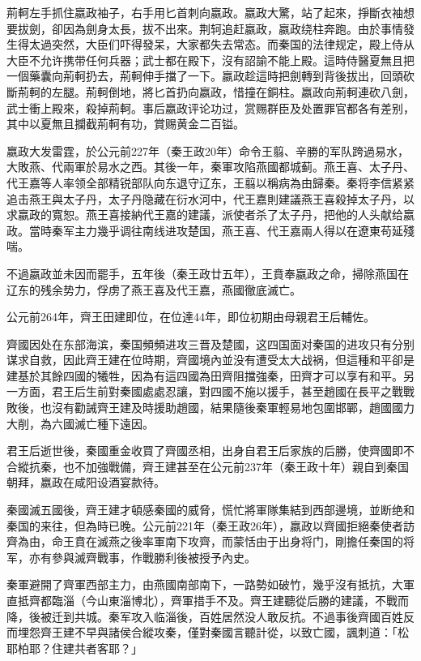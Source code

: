 荊軻左手抓住嬴政袖子，右手用匕首刺向嬴政。嬴政大驚，站了起來，掙斷衣袖想要拔劍，卻因為劍身太長，拔不出來。荆轲追赶嬴政，嬴政绕柱奔跑。由於事情發生得太過突然，大臣们吓得發呆，大家都失去常态。而秦国的法律规定，殿上侍从大臣不允许携带任何兵器；武士都在殿下，沒有詔諭不能上殿。這時侍醫夏無且把一個藥囊向荊軻扔去，荊軻伸手擋了一下。嬴政趁這時把劍轉到背後拔出，回頭砍斷荊軻的左腿。荊軻倒地，將匕首扔向嬴政，惜撞在銅柱。嬴政向荊軻連砍八劍，武士衝上殿來，殺掉荊軻。事后嬴政评论功过，赏赐群臣及处置罪官都各有差别，其中以夏無且攔截荊軻有功，賞赐黄金二百镒。

嬴政大发雷霆，於公元前227年（秦王政20年）命令王翦、辛勝的军队跨過易水，大敗燕、代兩軍於易水之西。其後一年，秦軍攻陷燕國都城蓟。燕王喜、太子丹、代王嘉等人率领全部精锐部队向东退守辽东，王翦以稱病為由歸秦。秦将李信紧紧追击燕王與太子丹，太子丹隐藏在衍水河中，代王嘉則建議燕王喜殺掉太子丹，以求嬴政的寬恕。燕王喜接納代王嘉的建議，派使者杀了太子丹，把他的人头献给嬴政。當時秦军主力幾乎调往南线进攻楚国，燕王喜、代王嘉兩人得以在遼東苟延殘喘。

不過嬴政並未因而罷手，五年後（秦王政廿五年），王賁奉嬴政之命，掃除燕国在辽东的残余势力，俘虏了燕王喜及代王嘉，燕國徹底滅亡。

公元前264年，齊王田建即位，在位達44年，即位初期由母親君王后輔佐。

齊國因处在东部海滨，秦国頻頻进攻三晋及楚國，这四国面对秦国的进攻只有分别谋求自救，因此齊王建在位時期，齊國境內並没有遭受太大战祸，但這種和平卻是建基於其餘四國的犧牲，因為有這四國為田齊阻擋強秦，田齊才可以享有和平。另一方面，君王后生前對秦國處處忍讓，對四國不施以援手，甚至趙國在長平之戰戰敗後，也沒有勸誡齊王建及時援助趙國，結果隨後秦軍輕易地包圍邯鄲，趙國國力大削，為六國滅亡種下遠因。

君王后逝世後，秦國重金收買了齊國丞相，出身自君王后家族的后勝，使齊國即不合縱抗秦，也不加強戰備，齊王建甚至在公元前237年（秦王政十年）親自到秦国朝拜，嬴政在咸阳设酒宴款待。

秦國滅五國後，齊王建才頓感秦國的威脅，慌忙將軍隊集結到西部邊境，並断绝和秦国的来往，但為時已晚。公元前221年（秦王政26年），嬴政以齊國拒絕秦使者訪齊為由，命王賁在滅燕之後率軍南下攻齊，而蒙恬由于出身将门，剛擔任秦国的将军，亦有參與滅齊戰事，作戰勝利後被授予內史。

秦軍避開了齊軍西部主力，由燕國南部南下，一路勢如破竹，幾乎沒有抵抗，大軍直抵齊都臨淄（今山東淄博北），齊軍措手不及。齊王建聽從后勝的建議，不戰而降，後被迁到共城。秦军攻入临淄後，百姓居然没人敢反抗。不過事後齊國百姓反而埋怨齊王建不早與諸侯合縱攻秦，僅對秦國言聽計從，以致亡國，諷刺道：「松耶柏耶？住建共者客耶？」

